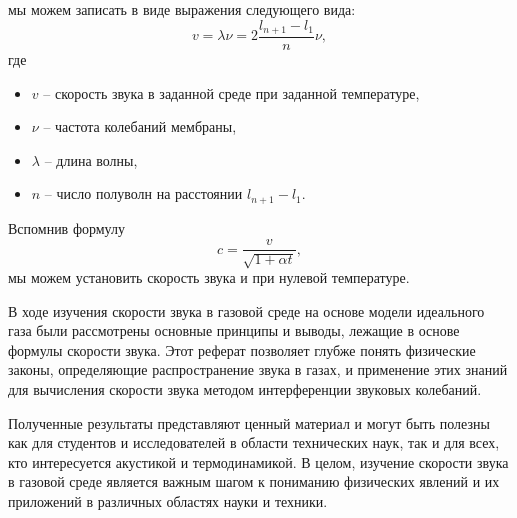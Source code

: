 \documentclass[referat,times]{SCWorks}
\begin{document}
мы можем записать в виде выражения следующего вида:
\begin{equation}
    v = \lambda \nu = 2 \frac{l_{n+1} - l_1}{n} \nu,
\end{equation}
где
\begin{itemize}
    \item $v$ -- скорость звука в заданной среде при заданной температуре,
    \item $\nu$ -- частота колебаний мембраны,
    \item $\lambda$ -- длина волны,
    \item $n$ -- число полуволн на расстоянии $l_{n+1} - l_1$.
\end{itemize}
\par Вспомнив формулу
\begin{equation*}
    c = \frac{v}{\sqrt{1 + \alpha t}},
\end{equation*}
мы можем установить скорость звука и при нулевой температуре.

\conclusion
\par В ходе изучения скорости звука в газовой среде на основе модели идеального газа были рассмотрены основные принципы и выводы, лежащие в основе формулы скорости звука. Этот реферат позволяет глубже понять физические законы, определяющие распространение звука в газах, и применение этих знаний для вычисления скорости звука методом интерференции звуковых колебаний.
\par Полученные результаты представляют ценный материал и могут быть полезны как для студентов и исследователей в области технических наук, так и для всех, кто интересуется акустикой и термодинамикой. В целом, изучение скорости звука в газовой среде является важным шагом к пониманию физических явлений и их приложений в различных областях науки и техники.

\newpage

%






\appendix
\end{document}
